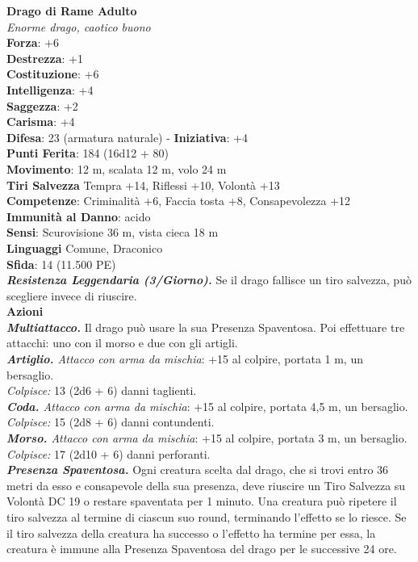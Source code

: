 \begin{multicols}{2}
\medskip\textbf{Drago di Rame Adulto}\\
\emph{Enorme drago, caotico buono}\\
\textbf{Forza}: +6\\
\textbf{Destrezza}: +1\\
\textbf{Costituzione}: +6\\
\textbf{Intelligenza}: +4\\
\textbf{Saggezza}: +2\\
\textbf{Carisma}: +4\\
\textbf{Difesa}: 23 (armatura naturale) - \textbf{Iniziativa}: +4\\
\textbf{Punti Ferita}: 184 (16d12 + 80)\\
\textbf{Movimento}: 12 m, scalata 12 m, volo 24 m\\
\textbf{Tiri Salvezza} Tempra +14, Riflessi +10, Volontà +13\\
\textbf{Competenze}: Criminalità +6, Faccia tosta +8, Consapevolezza +12\\
\textbf{Immunità al Danno}: acido\\
\textbf{Sensi}: Scurovisione 36 m, vista cieca 18 m\\
\textbf{Linguaggi} Comune, Draconico\\
\textbf{Sfida}: 14 (11.500 PE)\smallskip\\
\emph{\textbf{Resistenza Leggendaria (3/Giorno).}} Se il drago fallisce un tiro salvezza, può scegliere invece di riuscire.\\
\smallskip\textbf{Azioni} \\
\emph{\textbf{Multiattacco.}} Il drago può usare la sua Presenza Spaventosa. Poi effettuare tre attacchi: uno con il morso e due con gli artigli.\\
\emph{\textbf{Artiglio.} Attacco con arma da mischia}: +15 al colpire, portata 1 m, un bersaglio.\\
\emph{Colpisce:} 13 (2d6 + 6) danni taglienti.\\
\emph{\textbf{Coda.} Attacco con arma da mischia}: +15 al colpire, portata 4,5 m, un bersaglio.\\
\emph{Colpisce:} 15 (2d8 + 6) danni contundenti.\\
\emph{\textbf{Morso.} Attacco con arma da mischia}: +15 al colpire, portata 3 m, un bersaglio.\\
\emph{Colpisce:} 17 (2d10 + 6) danni perforanti.\\
\emph{\textbf{Presenza Spaventosa.}} Ogni creatura scelta dal drago, che si trovi entro 36 metri da esso e consapevole della sua presenza, deve riuscire un Tiro Salvezza su Volontà DC  19 o restare spaventata per 1 minuto. Una creatura può ripetere il tiro salvezza al termine di ciascun suo round, terminando l'effetto se lo riesce. Se il tiro salvezza della creatura ha successo o l'effetto ha termine per essa, la creatura è immune alla Presenza Spaventosa del drago per le successive 24 ore. \\

\end{multicols}
